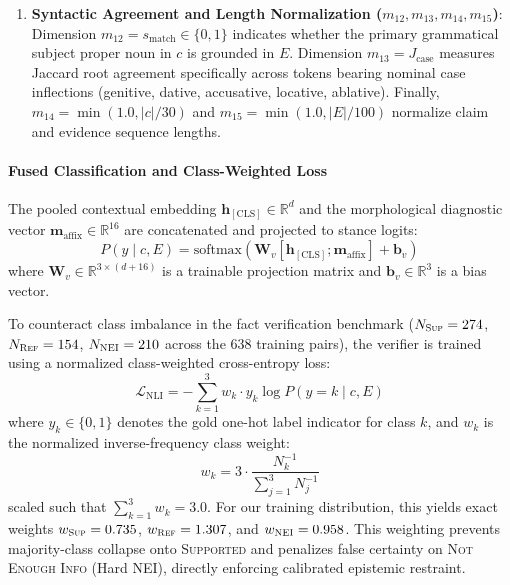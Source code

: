 \begin{enumerate}
    \item \textbf{Syntactic Agreement and Length Normalization ($m_{12}, m_{13}, m_{14}, m_{15}$)}: Dimension $m_{12} = s_{\text{match}} \in \{0, 1\}$ indicates whether the primary grammatical subject proper noun in $c$ is grounded in $E$. Dimension $m_{13} = J_{\text{case}}$ measures Jaccard root agreement specifically across tokens bearing nominal case inflections (genitive, dative, accusative, locative, ablative). Finally, $m_{14} = \min(1.0, |c| / 30)$ and $m_{15} = \min(1.0, |E| / 100)$ normalize claim and evidence sequence lengths.
\end{enumerate}

\paragraph{Fused Classification and Class-Weighted Loss}
The pooled contextual embedding $\mathbf{h}_{[\text{CLS}]} \in \mathbb{R}^d$ and the morphological diagnostic vector $\mathbf{m}_{\text{affix}} \in \mathbb{R}^{16}$ are concatenated and projected to stance logits:
\begin{equation}
\label{eq:nli_verifier}
P(y \mid c, E) = \mathrm{softmax}\left(\mathbf{W}_v \left[\mathbf{h}_{[\text{CLS}]}; \mathbf{m}_{\text{affix}}\right] + \mathbf{b}_v\right)
\end{equation}
where $\mathbf{W}_v \in \mathbb{R}^{3 \times (d + 16)}$ is a trainable projection matrix and $\mathbf{b}_v \in \mathbb{R}^3$ is a bias vector.

To counteract class imbalance in the fact verification benchmark ($N_{\textsc{Sup}} = 274$, $N_{\textsc{Ref}} = 154$, $N_{\textsc{NEI}} = 210$ across the 638 training pairs), the verifier is trained using a normalized class-weighted cross-entropy loss:
\begin{equation}
\label{eq:class_weighted_loss}
\mathcal{L}_{\text{NLI}} = - \sum_{k=1}^3 w_k \cdot y_k \log P(y = k \mid c, E)
\end{equation}
where $y_k \in \{0, 1\}$ denotes the gold one-hot label indicator for class $k$, and $w_k$ is the normalized inverse-frequency class weight:
\begin{equation}
\label{eq:class_weights}
w_k = 3 \cdot \frac{N_k^{-1}}{\sum_{j=1}^3 N_j^{-1}}
\end{equation}
scaled such that $\sum_{k=1}^3 w_k = 3.0$. For our training distribution, this yields exact weights $w_{\textsc{Sup}} = 0.735$, $w_{\textsc{Ref}} = 1.307$, and $w_{\textsc{NEI}} = 0.958$. This weighting prevents majority-class collapse onto \textsc{Supported} and penalizes false certainty on \textsc{Not Enough Info} (Hard NEI), directly enforcing calibrated epistemic restraint.

